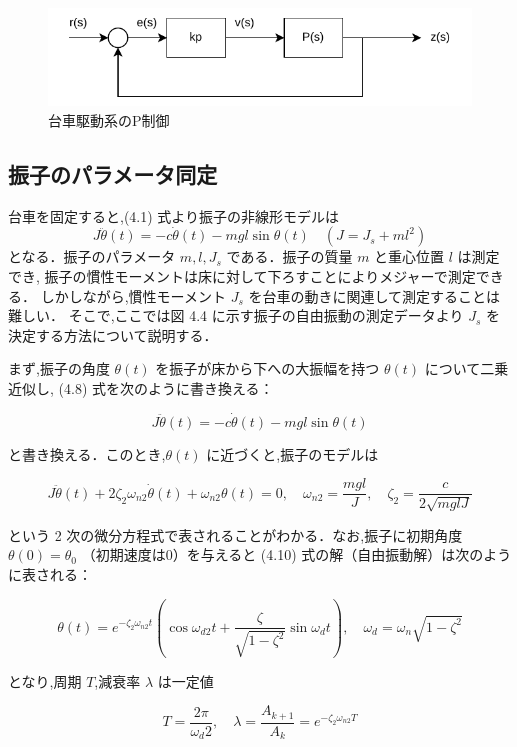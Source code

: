 \begin{figure}[h]
  \centering
  \includegraphics[scale=1]{sozai/2.pdf}
  \caption{台車駆動系のP制御}
\end{figure}

\subsection{振子のパラメータ同定}

台車を固定すると,(4.1) 式より振子の非線形モデルは
\[
  J\ddot{\theta}(t) = -c\dot{\theta}(t) - mgl\sin\theta(t) \quad (J = J_s + ml^2) \tag{4.8}
\]
となる．振子のパラメータ \( m, l, J_s \) である．振子の質量 \( m \) と重心位置 \( l \) は測定でき,
振子の慣性モーメントは床に対して下ろすことによりメジャーで測定できる．
しかしながら,慣性モーメント \( J_s \) を台車の動きに関連して測定することは難しい．
そこで,ここでは図 4.4 に示す振子の自由振動の測定データより \( J_s \) を決定する方法について説明する．

まず,振子の角度 \( \theta(t) \) を振子が床から下への大振幅を持つ \( \theta(t) \) について二乗近似し,
(4.8) 式を次のように書き換える：

\[
  J\ddot{\theta}(t) = -c\dot{\theta}(t) - mgl\sin\theta(t) \tag{4.9}
\]

と書き換える．このとき,\( \theta(t) \) に近づくと,振子のモデルは

\[
  J\ddot{\theta}(t) + 2\zeta_{2}\omega_{n2}\dot{\theta}(t) + \omega_{n2} \theta(t) = 0, \quad \omega_{n2} = \frac{mgl}{J}, \quad \zeta_2 = \frac{c}{2\sqrt{mglJ}} \tag{4.10}
\]

という 2 次の微分方程式で表されることがわかる．なお,振子に初期角度 \( \theta(0) = \theta_0 \)
（初期速度は0）を与えると (4.10) 式の解（自由振動解）は次のように表される：

\[
  \theta(t) = e^{-\zeta_{2}\omega_{n2}t} \left( \cos\omega_{d2}t + \frac{\zeta}{\sqrt{1-\zeta^2}} \sin \omega_d t \right), \quad \omega_d = \omega_n\sqrt{1-\zeta^2} \tag{4.11}
\]

となり,周期 \( T \),減衰率 \( \lambda \) は一定値

\[
  T = \frac{2\pi}{\omega_d2}, \quad \lambda = \frac{A_{k+1}}{A_k} = e^{-\zeta_{2}\omega_{n2} T} \tag{4.12}
\]

